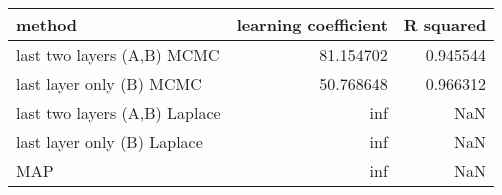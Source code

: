 \begin{tabular}{lrr}
\toprule
                        method &  learning coefficient &  R squared \\
\midrule
    last two layers (A,B) MCMC &             81.154702 &   0.945544 \\
      last layer only (B) MCMC &             50.768648 &   0.966312 \\
 last two layers (A,B) Laplace &                   inf &        NaN \\
   last layer only (B) Laplace &                   inf &        NaN \\
                           MAP &                   inf &        NaN \\
\bottomrule
\end{tabular}
